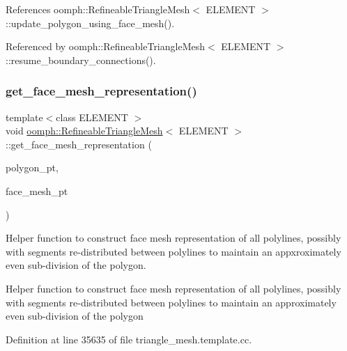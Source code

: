 References oomph\+::\+Refineable\+Triangle\+Mesh$<$ E\+L\+E\+M\+E\+N\+T $>$\+::update\+\_\+polygon\+\_\+using\+\_\+face\+\_\+mesh().



Referenced by oomph\+::\+Refineable\+Triangle\+Mesh$<$ E\+L\+E\+M\+E\+N\+T $>$\+::resume\+\_\+boundary\+\_\+connections().

\mbox{\label{classoomph_1_1RefineableTriangleMesh_a5ebb485316134f608bc89ab9854eac6c}} 
\subsubsection{\texorpdfstring{get\+\_\+face\+\_\+mesh\+\_\+representation()}{get\_face\_mesh\_representation()}\hspace{0.1cm}{\footnotesize\ttfamily [1/2]}}
{\footnotesize\ttfamily template$<$class E\+L\+E\+M\+E\+NT $>$ \\
void \hyperlink{classoomph_1_1RefineableTriangleMesh}{oomph\+::\+Refineable\+Triangle\+Mesh}$<$ E\+L\+E\+M\+E\+NT $>$\+::get\+\_\+face\+\_\+mesh\+\_\+representation (\begin{DoxyParamCaption}\item[{Triangle\+Mesh\+Polygon $\ast$}]{polygon\+\_\+pt,  }\item[{Vector$<$ Mesh $\ast$$>$ \&}]{face\+\_\+mesh\+\_\+pt }\end{DoxyParamCaption})\hspace{0.3cm}{\ttfamily [protected]}}



Helper function to construct face mesh representation of all polylines, possibly with segments re-\/distributed between polylines to maintain an appxroximately even sub-\/division of the polygon. 

Helper function to construct face mesh representation of all polylines, possibly with segments re-\/distributed between polylines to maintain an approximately even sub-\/division of the polygon 

Definition at line 35635 of file triangle\+\_\+mesh.\+template.\+cc.



